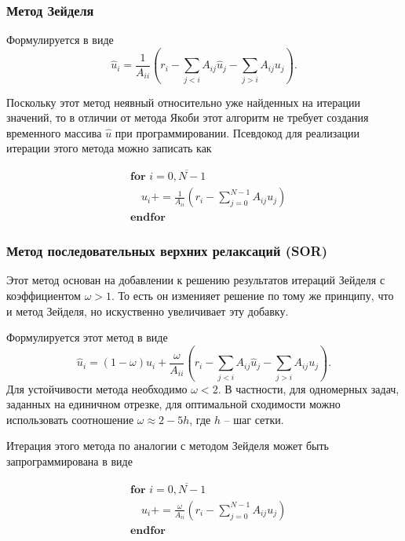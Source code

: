 \subsubsection{Метод Зейделя}
\label{sec:SLAE-Seidel}
Формулируется в виде
\begin{equation*}
    \hat u_i = \frac{1}{A_{ii}}\left(r_i - \sum_{j<i} A_{ij}{\hat u_j} - \sum_{j>i} A_{ij}{u_j} \right).
\end{equation*}

Поскольку этот метод неявный относительно уже найденных на итерации значений, то в отличии от метода Якоби этот алгоритм не требует создания временного массива $\hat u$
при программировании. Псевдокод для реализации итерации этого метода можно записать как

\begin{align*}
    &\textbf{for } i=\overline{0, N-1} \\ 
    &\quad u_i \mathrel{{+}{=}} \frac{1}{A_{ii}}\left(r_i - \sum_{j=0}^{N-1} A_{ij}{u_j}\right)\\
    &\textbf{endfor}
\end{align*}


\subsubsection{Метод последовательных верхних релаксаций (SOR)}
\label{sec:SLAE-SOR}
Этот метод основан на добавлении к решению результатов итераций Зейделя с
коэффициентом $\omega > 1$. То есть он изменияет решение по тому же
принципу, что и метод Зейделя, но искуственно увеличивает эту добавку.

Формулируется этот метод в виде
\begin{equation*}
    \hat u_i = (1-\omega) u_i + \frac{\omega}{A_{ii}}\left(r_i - \sum_{j<i} A_{ij}{\hat u_j} - \sum_{j>i} A_{ij}{u_j} \right).
\end{equation*}
Для устойчивости метода необходимо $\omega < 2$. В частности, для одномерных задач,
заданных на единичном отрезке, для оптимальной сходимости можно использовать соотношение $\omega \approx 2 - 5 h$,
где $h$ -- шаг сетки.

Итерация этого метода по аналогии с методом Зейделя может быть запрограммирована в виде

\begin{align*}
    &\textbf{for } i=\overline{0, N-1} \\ 
    &\quad u_i \mathrel{{+}{=}} \frac{\omega}{A_{ii}}\left(r_i - \sum_{j=0}^{N-1} A_{ij}{u_j}\right)\\
    &\textbf{endfor}
\end{align*}

